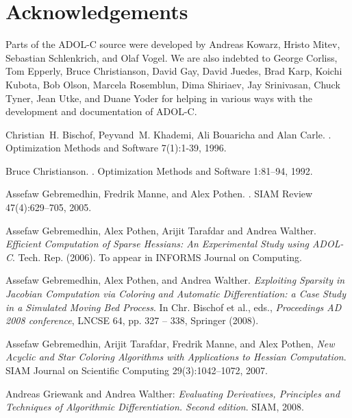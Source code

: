 \documentclass[11pt,twoside]{article}
\begin{document}
\section*{Acknowledgements}
%
Parts of the ADOL-C source were developed by Andreas
Kowarz, Hristo Mitev, Sebastian Schlenkrich,  and Olaf
Vogel. We are also indebted to George Corliss, 
Tom Epperly, Bruce Christianson, David Gay,  David Juedes,
Brad Karp, Koichi Kubota, Bob Olson,  Marcela Rosemblun, Dima
Shiriaev, Jay Srinivasan, Chuck Tyner, Jean Utke, and Duane Yoder for helping in
various ways with the development and documentation of ADOL-C. 
%
\begin{thebibliography}{10}

Christian~H. Bischof, Peyvand~M. Khademi, Ali Bouaricha and Alan Carle.
.
\newblock Optimization Methods and Software 7(1):1-39, 1996.

Bruce Christianson.
.
\newblock  Optimization Methods and Software 1:81--94, 1992.

Assefaw Gebremedhin, Fredrik Manne, and Alex Pothen.
.
\newblock SIAM Review 47(4):629--705, 2005.

Assefaw Gebremedhin, Alex Pothen, Arijit Tarafdar and Andrea Walther. 
{\em Efficient Computation of Sparse Hessians: An Experimental Study
  using ADOL-C}. Tech. Rep. (2006). To appear in INFORMS Journal on Computing.

 Assefaw Gebremedhin, Alex Pothen, and Andrea
  Walther. 
{\em Exploiting  Sparsity  in Jacobian Computation via Coloring and Automatic Differentiation: 
a Case Study in a Simulated Moving Bed Process}. 
In Chr. Bischof et al., eds.,  {\em Proceedings AD 2008 conference}, LNCSE 64, pp. 327 -- 338, Springer (2008).

Assefaw Gebremedhin, Arijit Tarafdar, Fredrik Manne, and Alex Pothen,
{\em New Acyclic and Star Coloring Algorithms with Applications to Hessian Computation}.
SIAM Journal on Scientific Computing 29(3):1042--1072, 2007.


Andreas Griewank and Andrea Walther: {\em Evaluating Derivatives, Principles and Techniques of
  Algorithmic Differentiation. Second edition}. SIAM, 2008.



\end{thebibliography}
\end{document}
